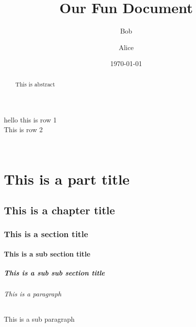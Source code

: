 \documentclass[12pt, a4paper]{report}
\begin{document}
\title{Our Fun Document}
\author{Bob \and Alice}
\date{\today}
\maketitle

\renewcommand{\abstractname}{New abstract \LaTeX{} title}
\begin{abstract}

    This is abstract
    \lipsum[1]

\end{abstract}


\newpage
hello this is row 1\\This is row 2

\newpage
\lipsum[2]\\
\lipsum[3]



\renewcommand{\contentsname}{** Table of Contents **}
\tableofcontents



\part{This is a part title}
\chapter{This is a chapter title}
\section[This is Short section title]{This is a section title}
\subsection{This is a sub section title}
\subsubsection{This is a sub sub section title}
\paragraph{This is a paragraph}
\subparagraph{This is a sub paragraph}




\end{document}
